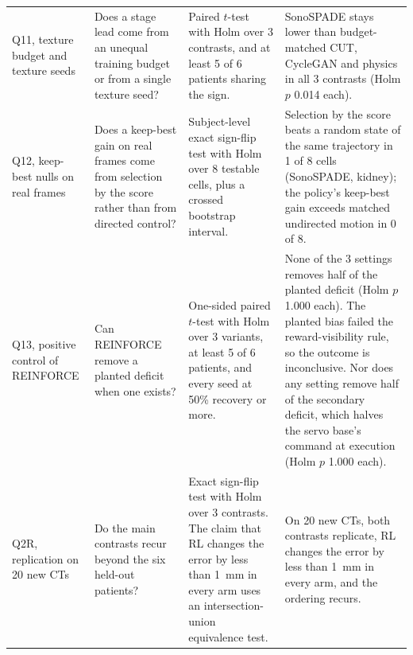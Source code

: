 \begin{table}[tp]
\begin{tabularx}{\textwidth}{@{}>{\raggedright\arraybackslash}p{} >{\raggedright\arraybackslash\hsize=0.75\hsize}X >{\raggedright\arraybackslash\hsize=1.25\hsize}X >{\raggedright\arraybackslash}X@{}}
Q11, texture budget and texture seeds & Does a stage lead come from an unequal training budget or from a single texture seed? & Paired $t$-test with Holm over 3 contrasts, and at least 5 of 6 patients sharing the sign. & SonoSPADE stays lower than budget-matched CUT, CycleGAN and physics in all 3 contrasts (Holm $p$ 0.014 each). \\[2pt]
Q12, keep-best nulls on real frames & Does a keep-best gain on real frames come from selection by the score rather than from directed control? & Subject-level exact sign-flip test with Holm over 8 testable cells, plus a crossed bootstrap interval. & Selection by the score beats a random state of the same trajectory in 1 of 8 cells (SonoSPADE, kidney); the policy's keep-best gain exceeds matched undirected motion in 0 of 8. \\[2pt]
Q13, positive control of REINFORCE & Can REINFORCE remove a planted deficit when one exists? & One-sided paired $t$-test with Holm over 3 variants, at least 5 of 6 patients, and every seed at 50\% recovery or more. & None of the 3 settings removes half of the planted deficit (Holm $p$ 1.000 each). The planted bias failed the reward-visibility rule, so the outcome is inconclusive. Nor does any setting remove half of the secondary deficit, which halves the servo base's command at execution (Holm $p$ 1.000 each). \\[2pt]
Q2R, replication on 20 new CTs & Do the main contrasts recur beyond the six held-out patients? & Exact sign-flip test with Holm over 3 contrasts. The claim that RL changes the error by less than 1~mm in every arm uses an intersection-union equivalence test. & On 20 new CTs, both contrasts replicate, RL changes the error by less than 1~mm in every arm, and the ordering recurs. \\[2pt]
\bottomrule
\end{tabularx}
\end{table}
